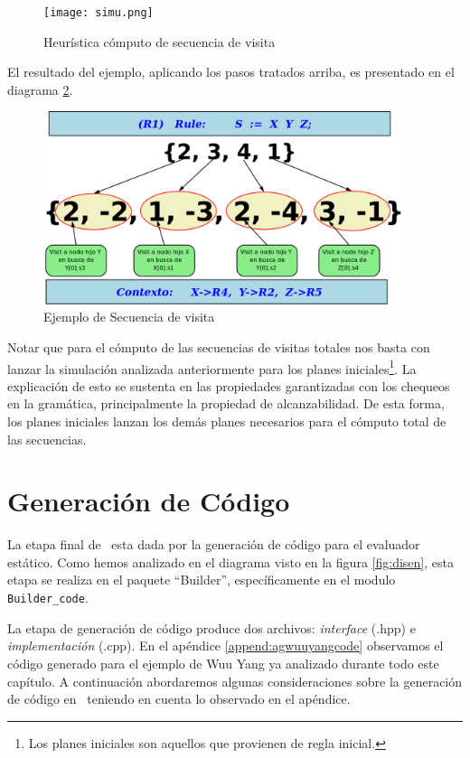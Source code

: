 \begin{figure}[!ht]\centering
\texttt{[image: simu.png]}
\caption{\label{fig:simul}Heurística cómputo de secuencia de visita}
\end{figure}

El resultado del ejemplo, aplicando los pasos tratados arriba, es presentado en el diagrama \ref{fig:resul_vis}.

\begin{figure}[!ht]\centering
\includegraphics[width=300pt,height=160pt]{plan2seq.png}
\caption{\label{fig:resul_vis} Ejemplo de Secuencia de visita}
\end{figure}

Notar que para el cómputo de las secuencias de visitas totales nos basta con lanzar la simulación analizada anteriormente para los planes iniciales\footnote{Los planes iniciales son aquellos que provienen de regla inicial.}. La explicación de esto se sustenta en las propiedades garantizadas con los chequeos en la gramática, principalmente la propiedad de alcanzabilidad. De esta forma, los planes iniciales lanzan los demás planes necesarios para el cómputo total de las secuencias.

\section{Generación de Código}
\label{sec:gencodigo}

La etapa final de \maggen\ esta dada por la generación de código para el evaluador estático. Como hemos analizado en el diagrama visto en la figura \ref{fig:disen}, esta etapa se realiza en el paquete ``Builder'', específicamente en el modulo \texttt{Builder\_code}.

La etapa de generación de código produce dos archivos: \textit{interface} (.hpp) e \textit{implementación} (.cpp). En el apéndice \ref{append:agwuuyangcode} observamos el código generado para el ejemplo de Wuu Yang ya analizado durante todo este capítulo.
A continuación abordaremos algunas consideraciones sobre la generación de código en \maggen\ teniendo en cuenta lo observado en el apéndice.

